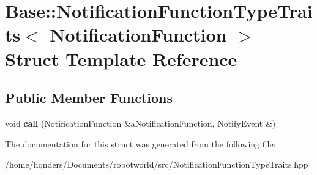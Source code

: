 \hypertarget{struct_base_1_1_notification_function_type_traits}{}\section{Base\+:\+:Notification\+Function\+Type\+Traits$<$ Notification\+Function $>$ Struct Template Reference}
\label{struct_base_1_1_notification_function_type_traits}
\subsection*{Public Member Functions}
\begin{DoxyCompactItemize}
\item 
void {\bfseries call} (Notification\+Function \&a\+Notification\+Function, Notify\+Event \&)\hypertarget{struct_base_1_1_notification_function_type_traits_aec5d2dfeb9d2c47940f7a6e09b81362b}{}\label{struct_base_1_1_notification_function_type_traits_aec5d2dfeb9d2c47940f7a6e09b81362b}

\end{DoxyCompactItemize}


The documentation for this struct was generated from the following file\+:\begin{DoxyCompactItemize}
\item 
/home/hqnders/\+Documents/robotworld/src/Notification\+Function\+Type\+Traits.\+hpp\end{DoxyCompactItemize}
